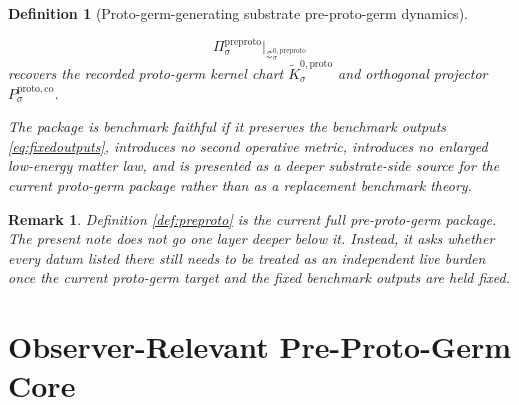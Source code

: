 \documentclass[11pt]{article}
\newcommand{\ProtoKernelCh}[1]{\widetilde K_{#1}^{0,\mathrm{proto}}}
\newcommand{\ProtoStateComp}[1]{P_{#1}^{\mathrm{proto,co}}}
\newcommand{\PreProtoProj}[1]{\Pi_{#1}^{\mathrm{preproto}}}
\newcommand{\PreProtoZeroCore}[1]{\mathcal Z_{#1}^{0,\mathrm{preproto}}}
\newtheorem{definition}{Definition}
\newtheorem{remark}{Remark}
\begin{document}
\begin{definition}[Proto-germ-generating substrate pre-proto-germ dynamics]
\begin{enumerate}
    \[
    \PreProtoProj{\sigma}\big|_{\PreProtoZeroCore{\sigma}}
    \]
    recovers the recorded proto-germ kernel chart \(\ProtoKernelCh{\sigma}\) and orthogonal projector \(\ProtoStateComp{\sigma}\).
\end{enumerate}
The package is \emph{benchmark faithful} if it preserves the benchmark outputs \eqref{eq:fixedoutputs}, introduces no second operative metric, introduces no enlarged low-energy matter law, and is presented as a deeper substrate-side source for the current proto-germ package rather than as a replacement benchmark theory.
\end{definition}

\begin{remark}
Definition \ref{def:preproto} is the current full pre-proto-germ package. The present note does not go one layer deeper below it. Instead, it asks whether every datum listed there still needs to be treated as an independent live burden once the current proto-germ target and the fixed benchmark outputs are held fixed.
\end{remark}

\section{Observer-Relevant Pre-Proto-Germ Core}
\end{document}
